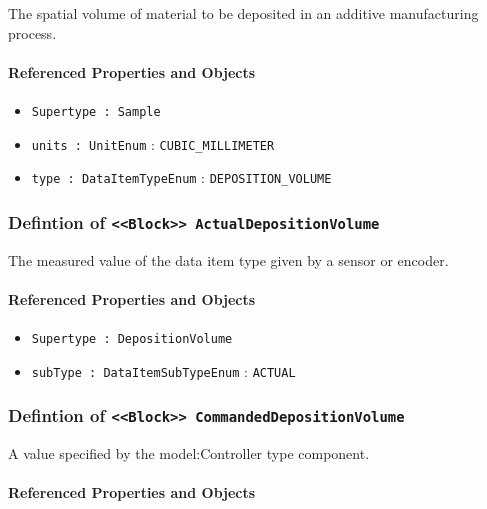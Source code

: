 \FloatBarrier

The spatial volume of material to be deposited in an additive manufacturing process.

\FloatBarrier
\paragraph{Referenced Properties and Objects}

\begin{itemize}
\item \texttt{Supertype : Sample}

\item \texttt{units : UnitEnum} : \texttt{CUBIC_MILLIMETER}

\item \texttt{type : DataItemTypeEnum} : \texttt{DEPOSITION_VOLUME}

\end{itemize}
\FloatBarrier
\subsubsection{Defintion of \texttt{<<Block>> ActualDepositionVolume}}
  \label{type:ActualDepositionVolume}

\FloatBarrier

The measured value of the data item type given by a sensor or encoder.

\FloatBarrier
\paragraph{Referenced Properties and Objects}

\begin{itemize}
\item \texttt{Supertype : DepositionVolume}

\item \texttt{subType : DataItemSubTypeEnum} : \texttt{ACTUAL}

\end{itemize}
\FloatBarrier
\subsubsection{Defintion of \texttt{<<Block>> CommandedDepositionVolume}}
  \label{type:CommandedDepositionVolume}

\FloatBarrier

A value specified by the {model:Controller} type component.

\FloatBarrier
\paragraph{Referenced Properties and Objects}

